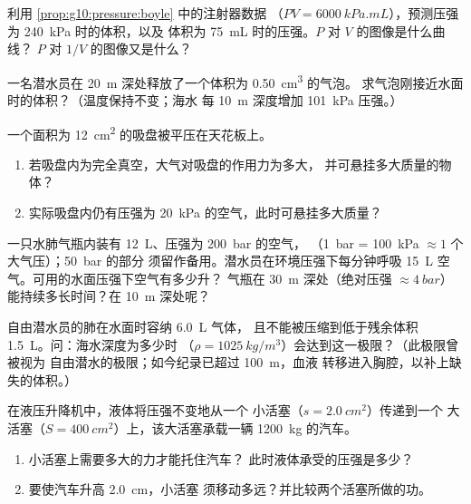 \begin{exercise}[$\star\star$]\label{exo:g10:pressure:10}
利用 \cref{prop:g10:pressure:boyle} 中的注射器数据
（$PV = \qty{6000}{kPa.mL}$），预测压强为 \qty{240}{kPa} 时的体积，以及
体积为 \qty{75}{mL} 时的压强。$P$ 对 $V$ 的图像是什么曲线？
$P$ 对 $1/V$ 的图像又是什么？
\end{exercise}

\begin{exercise}[$\star\star$]\label{exo:g10:pressure:11}
一名潜水员在 \qty{20}{m} 深处释放了一个体积为 \qty{0.50}{cm^3} 的气泡。
求气泡刚接近水面时的体积？（温度保持不变；海水
每 \qty{10}{m} 深度增加 \qty{101}{kPa} 压强。）
\end{exercise}

\begin{exercise}[$\star\star\star$]\label{exo:g10:pressure:12}
一个面积为 \qty{12}{cm^2} 的吸盘被平压在天花板上。
\begin{enumerate}
  \item 若吸盘内为完全真空，大气对吸盘的作用力为多大，
        并可悬挂多大质量的物体？
  \item 实际吸盘内仍有压强为 \qty{20}{kPa} 的空气，此时可悬挂多大质量？
\end{enumerate}
\end{exercise}

\begin{exercise}[$\star\star\star$]\label{exo:g10:pressure:13}
一只水肺气瓶内装有 \qty{12}{L}、压强为 \qty{200}{bar} 的空气，
（\qty{1}{bar} = \qty{100}{kPa} $\approx 1$ 个大气压）；\qty{50}{bar} 的部分
须留作备用。潜水员在环境压强下每分钟呼吸
\qty{15}{L} 空气。可用的水面压强下空气有多少升？
气瓶在 \qty{30}{m} 深处（绝对压强
$\approx \qty{4}{bar}$）能持续多长时间？在 \qty{10}{m} 深处呢？
\end{exercise}

\begin{exercise}[$\star\star\star$]\label{exo:g10:pressure:14}
自由潜水员的肺在水面时容纳 \qty{6.0}{L} 气体，
且不能被压缩到低于残余体积 \qty{1.5}{L}。问：海水深度为多少时
（$\rho = \qty{1025}{kg/m^3}$）会达到这一极限？（此极限曾被视为
自由潜水的极限；如今纪录已超过 \qty{100}{m}，血液
转移进入胸腔，以补上缺失的体积。）
\end{exercise}

\begin{exercise}[$\star\star\star$]\label{exo:g10:pressure:15}
在液压升降机中，液体将压强不变地从一个
小活塞（$s = \qty{2.0}{cm^2}$）传递到一个
大活塞（$S = \qty{400}{cm^2}$）上，该大活塞承载一辆 \qty{1200}{kg} 的汽车。
\begin{enumerate}
  \item 小活塞上需要多大的力才能托住汽车？
        此时液体承受的压强是多少？
  \item 要使汽车升高 \qty{2.0}{cm}，小活塞
        须移动多远？并比较两个活塞所做的功。
\end{enumerate}
\end{exercise}

